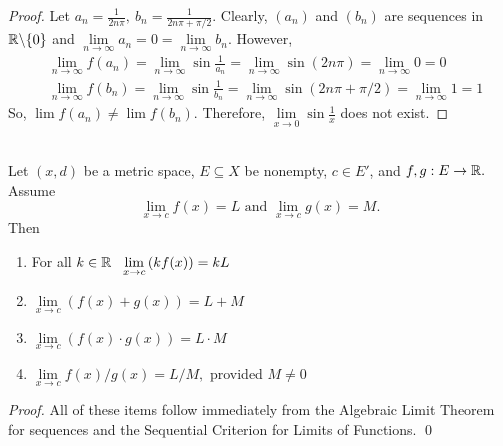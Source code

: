 \begin{proof}
    Let $a_n = \frac{1}{2n \pi}, ~b_n = \frac{1}{2n \pi + \pi / 2}.$ Clearly, $(a_n)$ and $(b_n)$ are sequences in $\mathbb{R} \backslash \{0\}$ and $\lim \limits_{n \to \infty} a_n = 0 = \lim \limits_{n \to \infty} b_n.$ However,
    \begin{align*}
        &\lim \limits_{n \to \infty} f(a_n) = \lim \limits_{n \to \infty} \sin \frac{1}{a_n} = \lim \limits_{n \to \infty} \sin (2n\pi) = \lim \limits_{n \to \infty} 0 = 0 \\
        &\lim \limits_{n \to \infty} f(b_n) = \lim \limits_{n \to \infty} \sin \frac{1}{b_n} = \lim \limits_{n \to \infty} \sin (2n\pi + \pi / 2) = \lim \limits_{n \to \infty} 1 = 1 
    \end{align*}
    So, $\lim f(a_n) \not = \lim f(b_n)$. Therefore, $\lim \limits_{x \to 0}\sin \frac{1}{x}$ does not exist.
\end{proof}

\begin{theorem}  \leavevmode \\
    \label{thm4.4}
    Let $(x,d)$ be a metric space, $E\subseteq X$ be nonempty, $c \in E'$, and $f,g:E \to \mathbb{R}.$ Assume
    $$\lim \limits_{x \to c} f(x) = L \text{ and } \lim \limits_{x \to c} g(x) = M.$$
    Then
    \begin{enumerate}[$(i)$]
        \item For all $k \in \mathbb{R} ~~\lim \limits_{x \to c}\left(k f(x)\right) = kL$
        \item $\lim \limits_{x \to c} \left(f(x) + g(x)\right) = L+M$
        \item $\lim \limits_{x \to c} \left(f(x) \cdot g(x)\right) = L \cdot M$
        \item $\lim \limits_{x \to c} f(x)/g(x) = L / M,$ provided $M \not = 0$
    \end{enumerate}
\end{theorem}

\begin{proof}
    All of these items follow immediately from the Algebraic Limit Theorem for sequences and the Sequential Criterion for Limits of Functions. \qed
\end{proof}